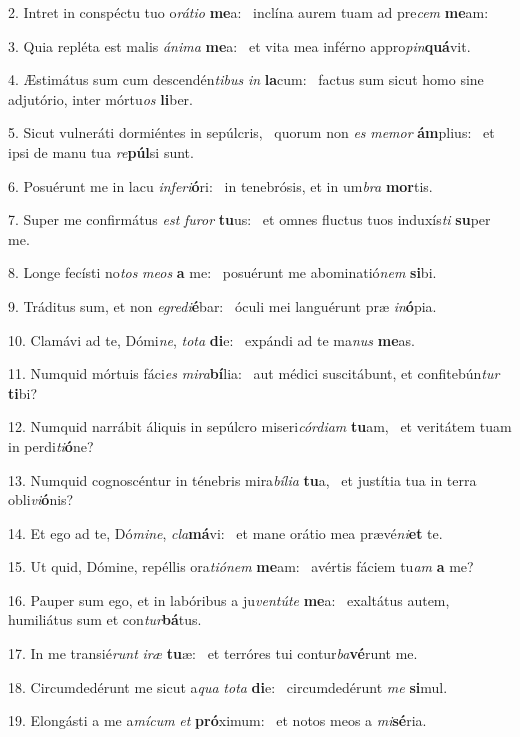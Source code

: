 2. Intret in conspéctu tuo o\textit{rá}\textit{ti}\textit{o} \textbf{me}a: \ast\  inclína aurem tuam ad pre\textit{cem} \textbf{me}am:\

3. Quia repléta est malis \textit{á}\textit{ni}\textit{ma} \textbf{me}a: \ast\  et vita mea inférno appro\textit{pin}\textbf{quá}vit.\

4. Æstimátus sum cum descendén\textit{ti}\textit{bus} \textit{in} \textbf{la}cum: \ast\  factus sum sicut homo sine adjutório, inter mórtu\textit{os} \textbf{li}ber.\

5. Sicut vulneráti dormiéntes in sepúlcris, \dag\  quorum non \textit{es} \textit{me}\textit{mor} \textbf{ám}plius: \ast\  et ipsi de manu tua \textit{re}\textbf{púl}si sunt.\

6. Posuérunt me in lacu \textit{in}\textit{fe}\textit{ri}\textbf{ó}ri: \ast\  in tenebrósis, et in um\textit{bra} \textbf{mor}tis.\

7. Super me confirmátus \textit{est} \textit{fu}\textit{ror} \textbf{tu}us: \ast\  et omnes fluctus tuos induxís\textit{ti} \textbf{su}per me.\

8. Longe fecísti no\textit{tos} \textit{me}\textit{os} \textbf{a} me: \ast\  posuérunt me abominatió\textit{nem} \textbf{si}bi.\

9. Tráditus sum, et non \textit{e}\textit{gre}\textit{di}\textbf{é}bar: \ast\  óculi mei languérunt præ \textit{in}\textbf{ó}pia.\

10. Clamávi ad te, Dómi\textit{ne}, \textit{to}\textit{ta} \textbf{di}e: \ast\  expándi ad te ma\textit{nus} \textbf{me}as.\

11. Numquid mórtuis fáci\textit{es} \textit{mi}\textit{ra}\textbf{bí}lia: \ast\  aut médici suscitábunt, et confitebún\textit{tur} \textbf{ti}bi?\

12. Numquid narrábit áliquis in sepúlcro miseri\textit{cór}\textit{di}\textit{am} \textbf{tu}am, \ast\  et veritátem tuam in perdi\textit{ti}\textbf{ó}ne?\

13. Numquid cognoscéntur in ténebris mira\textit{bí}\textit{li}\textit{a} \textbf{tu}a, \ast\  et justítia tua in terra obli\textit{vi}\textbf{ó}nis?\

14. Et ego ad te, Dó\textit{mi}\textit{ne}, \textit{cla}\textbf{má}vi: \ast\  et mane orátio mea prævé\textit{ni}\textbf{et} te.\

15. Ut quid, Dómine, repéllis ora\textit{ti}\textit{ó}\textit{nem} \textbf{me}am: \ast\  avértis fáciem tu\textit{am} \textbf{a} me?\

16. Pauper sum ego, et in labóribus a ju\textit{ven}\textit{tú}\textit{te} \textbf{me}a: \ast\  exaltátus autem, humiliátus sum et con\textit{tur}\textbf{bá}tus.\

17. In me transié\textit{runt} \textit{i}\textit{ræ} \textbf{tu}æ: \ast\  et terróres tui contur\textit{ba}\textbf{vé}runt me.\

18. Circumdedérunt me sicut a\textit{qua} \textit{to}\textit{ta} \textbf{di}e: \ast\  circumdedérunt \textit{me} \textbf{si}mul.\

19. Elongásti a me a\textit{mí}\textit{cum} \textit{et} \textbf{pró}ximum: \ast\  et notos meos a \textit{mi}\textbf{sé}ria.\

